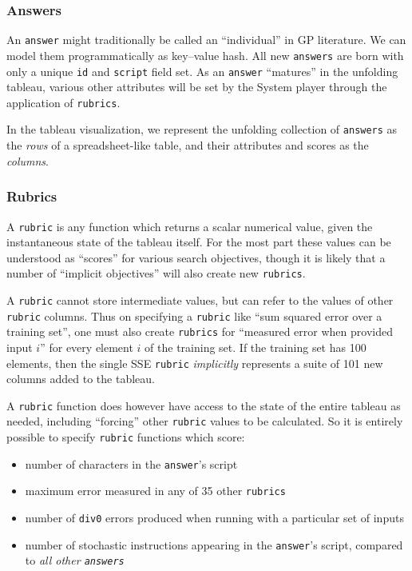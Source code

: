 \subsubsection{Answers}\hypertarget{answers}{}\label{answers}

An {\tt answer} might traditionally be called an ``individual'' in GP literature. We can model them programmatically as key--value hash. All new {\tt answers} are born with only a unique {\tt id} and {\tt script} field set. As an {\tt answer} ``matures'' in the unfolding tableau, various other attributes will be set by the System player through the application of {\tt rubrics}.

In the tableau visualization, we represent the unfolding collection of {\tt answers} as the \emph{rows} of a spreadsheet-like table, and their attributes and scores as the \emph{columns}.

\subsubsection{Rubrics}\hypertarget{rubrics}{}\label{rubrics}

A {\tt rubric} is any function which returns a scalar numerical value, given the instantaneous state of the tableau itself. For the most part these values can be understood as ``scores'' for various search objectives, though it is likely that a number of ``implicit objectives'' will also create new {\tt rubrics}.

A {\tt rubric} cannot store intermediate values, but can refer to the values of other {\tt rubric} columns. Thus on specifying a {\tt rubric} like ``sum squared error over a training set'', one must also create  {\tt rubrics} for ``measured error when provided input $i$'' for every element $i$ of the training set. If the training set has 100 elements, then the single SSE {\tt rubric} \emph{implicitly} represents a suite of 101 new columns added to the tableau.

A {\tt rubric} function does however have access to the state of the entire tableau as needed, including ``forcing'' other {\tt rubric} values to be calculated. So it is entirely possible to specify {\tt rubric} functions which score:

\begin{itemize}
\item number of characters in the {\tt answer}'s script
\item maximum error measured in any of 35 other {\tt rubrics}
\item number of {\tt div0} errors produced when running with a particular set of inputs
\item number of stochastic instructions appearing in the {\tt answer}'s script, compared to \emph{all other {\tt answers}}
\end{itemize}

